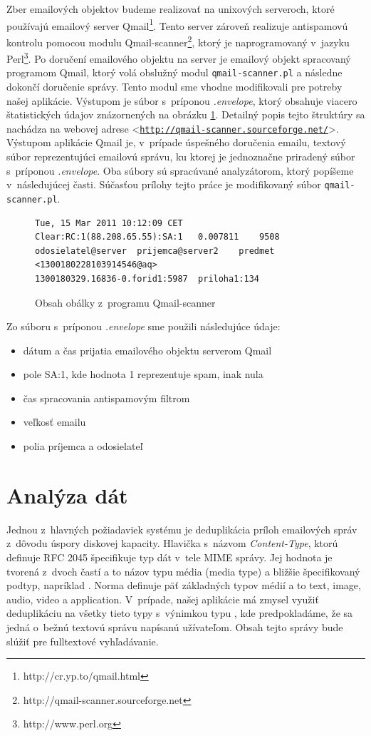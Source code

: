 \documentclass[11pt,twoside,a4paper]{book}
\let\oldUrl\url
\renewcommand\url[1]{<\texttt{\oldUrl{#1}}>}
\begin{document}
Zber emailových objektov budeme realizovať na unixových serveroch, ktoré používajú emailový server Qmail\footnote{http://cr.yp.to/qmail.html}. Tento server zároveň realizuje antispamovú kontrolu pomocou modulu Qmail-scanner\footnote{http://qmail-scanner.sourceforge.net}, ktorý je naprogramovaný v~jazyku Perl\footnote{http://www.perl.org}. Po doručení emailového objektu na server je emailový objekt spracovaný programom Qmail, ktorý volá obslužný modul \verb|qmail-scanner.pl| a následne dokončí doručenie správy. Tento modul sme vhodne modifikovali pre potreby našej aplikácie. Výstupom je súbor s~príponou \emph{.envelope}, ktorý obsahuje viacero štatistických údajov znázornených na obrázku \ref{fig:envelope}. Detailný popis tejto štruktúry sa nachádza na webovej adrese \url{http://qmail-scanner.sourceforge.net/}. Výstupom aplikácie Qmail je, v~prípade úspešného doručenia emailu, textový súbor reprezentujúci emailovú správu, ku ktorej je jednoznačne priradený súbor s~príponou \emph{.envelope}. Oba súbory sú spracúvané analyzátorom, ktorý popíšeme v~následujúcej časti. Súčasťou prílohy tejto práce je modifikovaný súbor \verb|qmail-scanner.pl|.

\begin{figure}[h]
\begin{verbatim}
Tue, 15 Mar 2011 10:12:09 CET	Clear:RC:1(88.208.65.55):SA:1	0.007811	9508	odosielatel@server	prijemca@server2	predmet	<1300180228103914546@aq>	
1300180329.16836-0.forid1:5987	priloha1:134
\end{verbatim}
 \caption{Obsah obálky z~programu Qmail-scanner}
 \label{fig:envelope}
\end{figure}

\noindent
Zo súboru s~príponou \emph{.envelope} sme použili následujúce údaje:
\begin{itemize}
 \item dátum a čas prijatia emailového objektu serverom Qmail
 \item pole SA:1, kde hodnota 1 reprezentuje spam, inak nula
 \item čas spracovania antispamovým filtrom
 \item veľkosť emailu
 \item polia príjemca a odosielateľ
\end{itemize}


\section{Analýza dát}
Jednou z~hlavných požiadaviek systému je deduplikácia príloh emailových správ z~dôvodu úspory diskovej kapacity. Hlavička s~názvom \emph{Content-Type}, ktorú definuje RFC 2045 špecifikuje typ dát v~tele MIME správy. Jej hodnota je tvorená z~dvoch častí a to názov typu média (media type) a bližšie špecifikovaný podtyp, napríklad \emph{}. Norma definuje päť základných typov médií a to text, image, audio, video a application. V~prípade, našej aplikácie má zmysel využiť deduplikáciu na všetky tieto typy s~výnimkou typu \emph{}, kde predpokladáme, že sa jedná o~bežnú textovú správu napísanú užívateľom. Obsah tejto správy bude slúžiť pre fulltextové vyhľadávanie.
\end{document}
